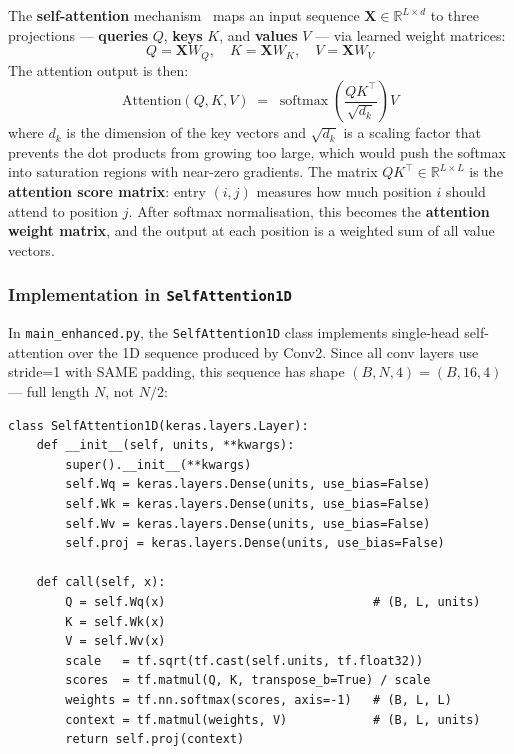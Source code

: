 \documentclass[12pt, a4paper]{article}
\newcommand{\code}[1]{\texttt{\color{CodeRed}#1}}
\begin{document}
The \textbf{self-attention} mechanism~\cite{vaswani2017attention} maps
an input sequence $\mathbf{X} \in \mathbb{R}^{L \times d}$ to three
projections — \textbf{queries} $Q$, \textbf{keys} $K$, and
\textbf{values} $V$ — via learned weight matrices:
%
\begin{equation}
  Q = \mathbf{X} W_Q, \quad
  K = \mathbf{X} W_K, \quad
  V = \mathbf{X} W_V
  \label{eq:qkv}
\end{equation}
%
The attention output is then:
%
\begin{equation}
  \text{Attention}(Q, K, V)
  \;=\;
  \operatorname{softmax}\!\left(
    \frac{Q K^\top}{\sqrt{d_k}}
  \right) V
  \label{eq:attention}
\end{equation}
%
where $d_k$ is the dimension of the key vectors and $\sqrt{d_k}$ is a
scaling factor that prevents the dot products from growing too large,
which would push the softmax into saturation regions with near-zero
gradients. The matrix $Q K^\top \in \mathbb{R}^{L \times L}$ is the
\textbf{attention score matrix}: entry $(i,j)$ measures how much
position $i$ should attend to position $j$. After softmax normalisation,
this becomes the \textbf{attention weight matrix}, and the output at
each position is a weighted sum of all value vectors.

\subsubsection*{Implementation in \code{SelfAttention1D}}

In \code{main\_enhanced.py}, the \code{SelfAttention1D} class implements
single-head self-attention over the 1D sequence produced by Conv2.
Since all conv layers use stride=1 with SAME padding, this sequence
has shape $(B, N, 4) = (B, 16, 4)$ --- full length $N$, not $N/2$:

\begin{lstlisting}[caption={\code{SelfAttention1D} in \code{main\_enhanced.py}}]
class SelfAttention1D(keras.layers.Layer):
    def __init__(self, units, **kwargs):
        super().__init__(**kwargs)
        self.Wq = keras.layers.Dense(units, use_bias=False)
        self.Wk = keras.layers.Dense(units, use_bias=False)
        self.Wv = keras.layers.Dense(units, use_bias=False)
        self.proj = keras.layers.Dense(units, use_bias=False)

    def call(self, x):
        Q = self.Wq(x)                             # (B, L, units)
        K = self.Wk(x)
        V = self.Wv(x)
        scale   = tf.sqrt(tf.cast(self.units, tf.float32))
        scores  = tf.matmul(Q, K, transpose_b=True) / scale
        weights = tf.nn.softmax(scores, axis=-1)   # (B, L, L)
        context = tf.matmul(weights, V)            # (B, L, units)
        return self.proj(context)
\end{lstlisting}
\end{document}

